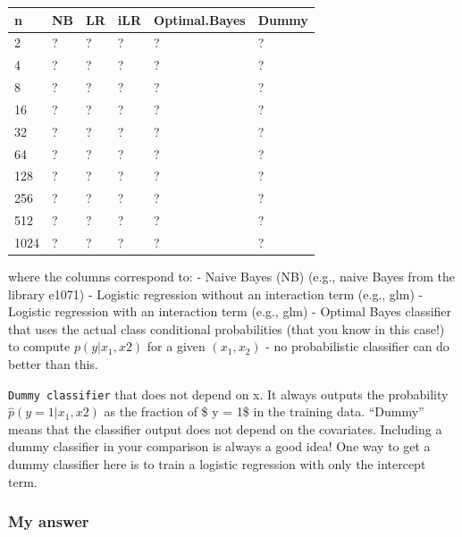 \documentclass[
]{article}
\begin{document}
\begin{tabular}{l|l|l|l|l|l}
\hline
n & NB & LR & iLR & Optimal.Bayes & Dummy\\
\hline
2 & ? & ? & ? & ? & ?\\
\hline
4 & ? & ? & ? & ? & ?\\
\hline
8 & ? & ? & ? & ? & ?\\
\hline
16 & ? & ? & ? & ? & ?\\
\hline
32 & ? & ? & ? & ? & ?\\
\hline
64 & ? & ? & ? & ? & ?\\
\hline
128 & ? & ? & ? & ? & ?\\
\hline
256 & ? & ? & ? & ? & ?\\
\hline
512 & ? & ? & ? & ? & ?\\
\hline
1024 & ? & ? & ? & ? & ?\\
\hline
\end{tabular}

where the columns correspond to: - Naive Bayes (NB) (e.g., naive Bayes
from the library e1071) - Logistic regression without an interaction
term (e.g., glm) - Logistic regression with an interaction term (e.g.,
glm) - Optimal Bayes classifier that uses the actual class conditional
probabilities (that you know in this case!) to compute \(p(y|x_1,x2)\)
for a given \((x_1,x_2)\) - no probabilistic classifier can do better
than this.

\texttt{Dummy\ classifier} that does not depend on x. It always outputs
the probability \(\hat{p} (y = 1 | x_1, x2)\) as the fraction of \$ y =
1\$ in the training data. ``Dummy'' means that the classifier output
does not depend on the covariates. Including a dummy classifier in your
comparison is always a good idea! One way to get a dummy classifier here
is to train a logistic regression with only the intercept term.

\hypertarget{my-answer-9}{%
\subsubsection{My answer}\label{my-answer-9}}
\end{document}

